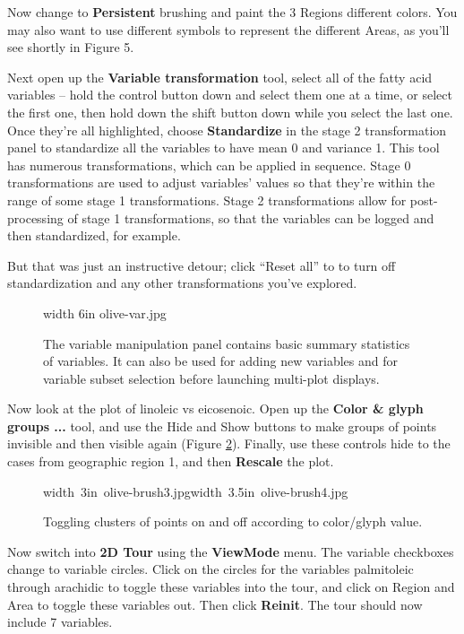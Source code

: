 \documentclass[11pt]{article}
\begin{document}
Now change to {\bf Persistent} brushing and paint the 3 Regions
different colors. You may also want to use different symbols to
represent the different Areas, as you'll see shortly in Figure 5.

Next open up the {\bf Variable transformation} tool, select all of
the fatty acid variables -- hold the control button down and select
them one at a time, or select the first one, then hold down the shift
button down while you select the last one.  Once they're all
highlighted, choose {\bf Standardize} in the stage 2 transformation
panel to standardize all the variables to have mean 0 and variance
1.  This tool has numerous transformations, which can be applied in
sequence.  Stage 0 transformations are used to adjust variables'
values so that they're within the range of some stage 1
transformations. Stage 2 transformations allow for post-processing of
stage 1 transformations, so that the variables can be logged and then
standardized, for example.

But that was just an instructive detour; click ``Reset all'' to
to turn off standardization and any other transformations you've
explored.

\begin{figure}[htp]
\pdfimage width 6in {olive-var.jpg}
\caption{The variable manipulation panel contains basic summary 
statistics of variables. It can also be used for adding new variables
and for variable subset selection before launching multi-plot
displays.
}%
\label{fig4}
\end{figure}

Now look at the plot of linoleic vs eicosenoic. Open up the {\bf
Color \& glyph groups ...} tool, and use the Hide and Show buttons to
make groups of points invisible and then visible again (Figure
\ref{fig5}). Finally, use these controls hide to the cases from
geographic region 1, and then {\bf Rescale} the plot.

\begin{figure}[htp]
\hbox{\pdfimage width 3in {olive-brush3.jpg}\pdfimage width 3.5in {olive-brush4.jpg}}
\caption{Toggling clusters of points on and off according to color/glyph value.}
\label{fig5}
\end{figure}

Now switch into {\bf 2D Tour} using the {\bf ViewMode} menu. The
variable checkboxes change to variable circles. Click on the circles
for the variables palmitoleic through arachidic to toggle these variables
into the tour, and click on Region and Area to toggle these variables out.
Then click {\bf Reinit}.  The tour should now include 7 variables.
\end{document}
